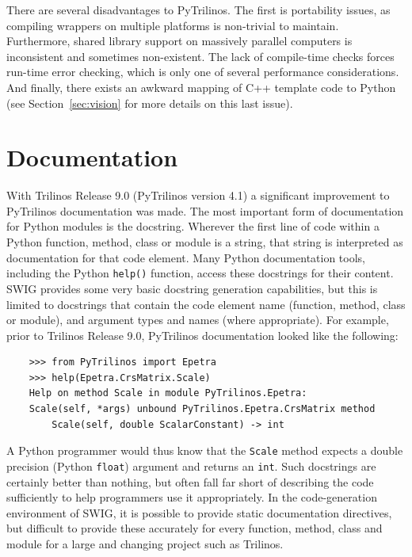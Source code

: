 \documentclass[11pt]{article}
\begin{document}
There are several disadvantages to PyTrilinos.  The first is portability issues, as compiling wrappers on multiple platforms is non-trivial to maintain.  Furthermore, shared library support on massively parallel computers is inconsistent and sometimes non-existent.  The lack of compile-time checks forces run-time error checking, which is only one of several performance considerations.  And finally, there exists an awkward mapping of C++ template code to Python (see Section~\ref{sec:vision} for more details on this last issue).

\section{Documentation}
\label{sec:documentation}

With Trilinos Release 9.0 (PyTrilinos version 4.1) a significant improvement to PyTrilinos documentation was made.  The most important form of documentation for Python modules is the docstring.  Wherever the first line of code within a Python function, method, class or module is a string, that string is interpreted as documentation for that code element.  Many Python documentation tools, including the Python {\tt help()} function, access these docstrings for their content.  SWIG provides some very basic docstring generation capabilities, but this is limited to docstrings that contain the code element name (function, method, class or module), and argument types and names (where appropriate).  For example, prior to Trilinos Release 9.0, PyTrilinos documentation looked like the following:

\begin{verbatim}
    >>> from PyTrilinos import Epetra
    >>> help(Epetra.CrsMatrix.Scale)
    Help on method Scale in module PyTrilinos.Epetra:
    Scale(self, *args) unbound PyTrilinos.Epetra.CrsMatrix method
        Scale(self, double ScalarConstant) -> int
\end{verbatim}

A Python programmer would thus know that the {\tt Scale} method expects a double precision (Python {\tt float}) argument and returns an {\tt int}.  Such docstrings are certainly better than nothing, but often fall far short of describing the code sufficiently to help programmers use it appropriately.  In the code-generation environment of SWIG, it is possible to provide static documentation directives, but difficult to provide these accurately for every function, method, class and module for a large and changing project such as Trilinos.
\end{document}
